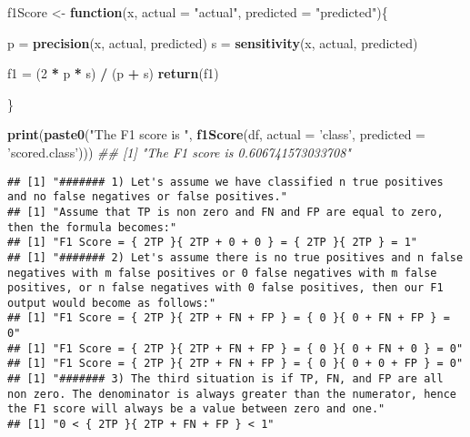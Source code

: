 \documentclass[
]{article}
\newenvironment{Shaded}{\begin{snugshade}}{\end{snugshade}}
\newcommand{\CommentTok}[1]{\textcolor[rgb]{0.56,0.35,0.01}{\textit{#1}}}
\newcommand{\ControlFlowTok}[1]{\textcolor[rgb]{0.13,0.29,0.53}{\textbf{#1}}}
\newcommand{\DataTypeTok}[1]{\textcolor[rgb]{0.13,0.29,0.53}{#1}}
\newcommand{\DecValTok}[1]{\textcolor[rgb]{0.00,0.00,0.81}{#1}}
\newcommand{\KeywordTok}[1]{\textcolor[rgb]{0.13,0.29,0.53}{\textbf{#1}}}
\newcommand{\NormalTok}[1]{#1}
\newcommand{\OperatorTok}[1]{\textcolor[rgb]{0.81,0.36,0.00}{\textbf{#1}}}
\newcommand{\StringTok}[1]{\textcolor[rgb]{0.31,0.60,0.02}{#1}}
\begin{document}
\begin{Shaded}
\begin{Highlighting}[]
\NormalTok{f1Score <-}\StringTok{ }\ControlFlowTok{function}\NormalTok{(x, }\DataTypeTok{actual =} \StringTok{"actual"}\NormalTok{, }\DataTypeTok{predicted =} \StringTok{"predicted"}\NormalTok{)\{}
        
\NormalTok{        p =}\StringTok{ }\KeywordTok{precision}\NormalTok{(x, actual, predicted)}
\NormalTok{        s =}\StringTok{ }\KeywordTok{sensitivity}\NormalTok{(x, actual, predicted)}
        
\NormalTok{        f1 =}\StringTok{ }\NormalTok{(}\DecValTok{2} \OperatorTok{*}\StringTok{ }\NormalTok{p }\OperatorTok{*}\StringTok{ }\NormalTok{s) }\OperatorTok{/}\StringTok{ }\NormalTok{(p }\OperatorTok{+}\StringTok{ }\NormalTok{s)}
        \KeywordTok{return}\NormalTok{(f1)}
        
\NormalTok{\}}

\KeywordTok{print}\NormalTok{(}\KeywordTok{paste0}\NormalTok{(}\StringTok{"The F1 score is "}\NormalTok{, }\KeywordTok{f1Score}\NormalTok{(df, }\DataTypeTok{actual =} \StringTok{'class'}\NormalTok{, }\DataTypeTok{predicted =} \StringTok{'scored.class'}\NormalTok{)))}
\CommentTok{## [1] "The F1 score is 0.606741573033708"}
\end{Highlighting}
\end{Shaded}

\begin{verbatim}
## [1] "####### 1) Let's assume we have classified n true positives and no false negatives or false positives."
## [1] "Assume that TP is non zero and FN and FP are equal to zero, then the formula becomes:"
## [1] "F1 Score = { 2TP }{ 2TP + 0 + 0 } = { 2TP }{ 2TP } = 1"
## [1] "####### 2) Let's assume there is no true positives and n false negatives with m false positives or 0 false negatives with m false positives, or n false negatives with 0 false positives, then our F1 output would become as follows:"
## [1] "F1 Score = { 2TP }{ 2TP + FN + FP } = { 0 }{ 0 + FN + FP } = 0"
## [1] "F1 Score = { 2TP }{ 2TP + FN + FP } = { 0 }{ 0 + FN + 0 } = 0"
## [1] "F1 Score = { 2TP }{ 2TP + FN + FP } = { 0 }{ 0 + 0 + FP } = 0"
## [1] "####### 3) The third situation is if TP, FN, and FP are all non zero. The denominator is always greater than the numerator, hence the F1 score will always be a value between zero and one."
## [1] "0 < { 2TP }{ 2TP + FN + FP } < 1"
\end{verbatim}
\end{document}
